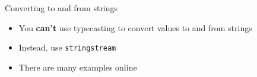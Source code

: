 \begin{frame}[fragile]{Converting to and from strings}
    \begin{itemize}
        \item You \textbf{can't} use typecasting to convert values to and from strings \pause
        \item Instead, use \lstinline{stringstream} \pause
        \item There are many examples online
    \end{itemize}
\end{frame}

